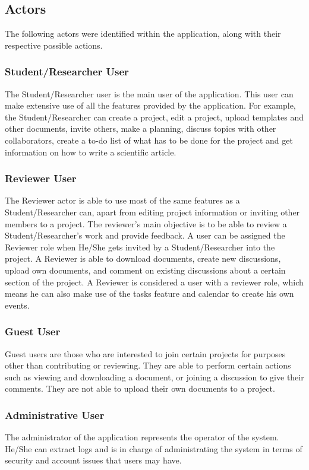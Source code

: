 \subsection{Actors} %
\label{sub:actors}
The following actors were identified within the application, along with their respective possible actions.
\subsubsection{Student/Researcher User} 
The Student/Researcher user is the main user of the application. This user can make extensive use of all the features provided by the application. For example, the Student/Researcher can create a project, edit a project, upload templates and other documents, invite others, make a planning, discuss topics with other collaborators, create a to-do list of what has to be done for the project and get information on how to write a scientific article.

\newpage

\subsubsection{Reviewer User} 
The Reviewer actor is able to use most of the same features as a Student/Researcher can, apart from editing project information or inviting other members to a project. The reviewer's main objective is to be able to review a Student/Researcher's work and provide feedback. A user can be assigned the Reviewer role when He/She gets invited by a Student/Researcher into the project. A Reviewer is able to download documents, create new discussions, upload own documents, and comment on existing discussions about a certain section of the project. A Reviewer is considered a user with a reviewer role, which means he can also make use of the tasks feature and calendar to create his own events.

\subsubsection{Guest User} 
Guest users are those who are interested to join certain projects for purposes other than contributing or reviewing. They are able to perform certain actions such as viewing and downloading a document, or joining a discussion to give their comments. They are not able to upload their own documents to a project.

\subsubsection{Administrative User} 
The administrator of the application represents the operator of the system. He/She can extract logs and is in charge of administrating the system in terms of security and account issues that users may have.


